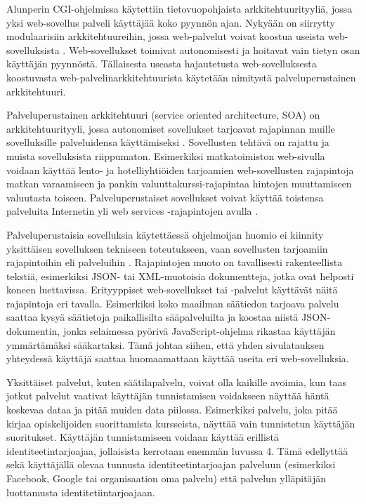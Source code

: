 Alunperin CGI-ohjelmissa käytettiin tietovuopohjaista arkkitehtuurityyliä, jossa yksi web-sovellus palveli käyttäjää koko pyynnön ajan. Nykyään on siirrytty modulaarisiin arkkitehtuureihin, jossa web-palvelut voivat koostua useista web-sovelluksista \cite{soa}. Web-sovellukset toimivat autonomisesti ja hoitavat vain tietyn osan käyttäjän pyynnöstä. Tällaisesta useasta hajautetusta web-sovelluksesta koostuvasta web-palvelinarkkitehtuurista käytetään nimitystä palveluperustainen arkkitehtuuri.

Palveluperustainen arkkitehtuuri (service oriented architecture, SOA) on arkkitehtuurityyli, jossa autonomiset sovellukset tarjoavat rajapinnan muille sovelluksille palveluidensa käyttämiseksi \cite{soa}. Sovellusten tehtävä on rajattu ja muista sovelluksista riippumaton. Esimerkiksi matkatoimiston web-sivulla voidaan käyttää lento- ja hotelliyhtiöiden tarjoamien web-sovellusten rajapintoja matkan varaamiseen ja pankin valuuttakurssi-rajapintaa hintojen muuttamiseen valuutasta toiseen. Palveluperustaiset sovellukset voivat käyttää toistensa palveluita Internetin yli web services -rajapintojen avulla \cite{soa}.

Palveluperustaisia sovelluksia käytettäessä ohjelmoijan huomio ei kiinnity yksittäisen sovelluksen tekniseen toteutukseen, vaan sovellusten tarjoamiin rajapintoihin eli palveluihin \cite{soa}. Rajapintojen muoto on tavallisesti rakenteellista tekstiä, esimerkiksi JSON- tai XML-muotoisia dokumentteja, jotka ovat helposti koneen luettavissa. Erityyppiset web-sovellukset tai -palvelut käyttävät näitä rajapintoja eri tavalla. Esimerkiksi koko maailman säätiedon tarjoava palvelu saattaa kysyä säätietoja paikallisilta sääpalveluilta ja koostaa niistä JSON-dokumentin, jonka selaimessa pyörivä JavaScript-ohjelma rikastaa käyttäjän ymmärtämäksi sääkartaksi. Tämä johtaa siihen, että yhden sivulatauksen yhteydessä käyttäjä saattaa huomaamattaan käyttää useita eri web-sovelluksia.

Yksittäiset palvelut, kuten säätilapalvelu, voivat olla kaikille avoimia, kun taas jotkut palvelut vaativat käyttäjän tunnistamisen voidakseen näyttää häntä koskevaa dataa ja pitää muiden data piilossa. Esimerkiksi palvelu, joka pitää kirjaa opiskelijoiden suorittamista kursseista, näyttää vain tunnistetun käyttäjän suoritukset. Käyttäjän tunnistamiseen voidaan käyttää erillistä identiteetintarjoajaa, jollaisista kerrotaan enemmän luvussa 4. Tämä edellyttää sekä käyttäjällä olevaa tunnusta identiteetintarjoajan palveluun (esimerkiksi Facebook, Google tai organisaation oma palvelu) että palvelun ylläpitäjän luottamusta identitetiintarjoajaan.